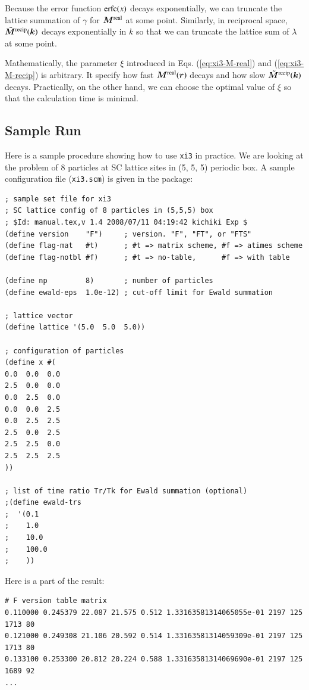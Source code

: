\documentclass{book}
\begin{document}
Because the error function ${\rm erfc}(x)$ decays exponentially,
we can truncate the lattice summation of $\gamma$ for $\bm{M}^{\rm real}$
at some point.
Similarly, in reciprocal space, $\tilde{\bm{M}}^{\rm recip}(\bm{k})$
decays exponentially in $k$ so that we can truncate the lattice sum
of $\lambda$ at some point.

Mathematically, the parameter $\xi$ introduced in
Eqs. (\ref{eq:xi3-M-real}) and (\ref{eq:xi3-M-recip})
is arbitrary. It specify how fast $\bm{M}^{\rm real}(\bm{r})$ decays
and how slow $\tilde{\bm{M}}^{\rm recip}(\bm{k})$ decays.
Practically, on the other hand, we can choose the optimal value of $\xi$
so that the calculation time is minimal.


\subsection{Sample Run}
Here is a sample procedure showing how to use {\tt xi3} in practice.
We are looking at the problem of 8 particles at SC lattice sites
in (5, 5, 5) periodic box.
A sample configuration file ({\tt xi3.scm}) is given in the package:
{\small
\begin{verbatim}
; sample set file for xi3
; SC lattice config of 8 particles in (5,5,5) box
; $Id: manual.tex,v 1.4 2008/07/11 04:19:42 kichiki Exp $
(define version    "F")     ; version. "F", "FT", or "FTS"
(define flag-mat   #t)      ; #t => matrix scheme, #f => atimes scheme
(define flag-notbl #f)      ; #t => no-table,      #f => with table

(define np         8)       ; number of particles
(define ewald-eps  1.0e-12) ; cut-off limit for Ewald summation

; lattice vector
(define lattice '(5.0  5.0  5.0))

; configuration of particles
(define x #(
0.0  0.0  0.0
2.5  0.0  0.0
0.0  2.5  0.0
0.0  0.0  2.5
0.0  2.5  2.5
2.5  0.0  2.5
2.5  2.5  0.0
2.5  2.5  2.5
))

; list of time ratio Tr/Tk for Ewald summation (optional)
;(define ewald-trs
;  '(0.1
;    1.0
;    10.0
;    100.0
;    ))
\end{verbatim}
}
Here is a part of the result:
{\small
\begin{verbatim}
# F version table matrix
0.110000 0.245379 22.087 21.575 0.512 1.33163581314065055e-01 2197 125 1713 80
0.121000 0.249308 21.106 20.592 0.514 1.33163581314059309e-01 2197 125 1713 80
0.133100 0.253300 20.812 20.224 0.588 1.33163581314069690e-01 2197 125 1689 92
...
\end{verbatim}
}
\end{document}
